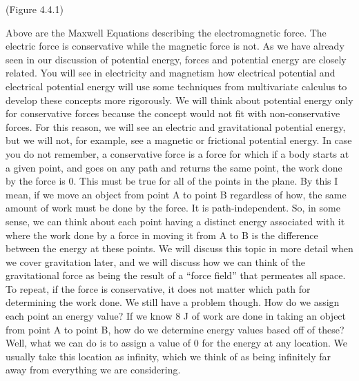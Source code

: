 \begin{center}
(Figure 4.4.1)
\end{center}
Above are the Maxwell Equations describing the electromagnetic force. The electric force is conservative while the magnetic force is not. 
As we have already seen in our discussion of potential energy, forces and potential energy are closely related. You will see in electricity and magnetism how electrical potential and electrical potential energy will use some techniques from multivariate calculus to develop these concepts more rigorously. We will think about potential energy only for conservative forces because the concept would not fit with non-conservative forces. For this reason, we will see an electric and gravitational potential energy, but we will not, for example, see a magnetic or frictional potential energy. In case you do not remember, a conservative force is a force for which if a body starts at a given point, and goes on any path and returns the same point, the work done by the force is 0. This must be true for all of the points in the plane. By this I mean, if we move an object from point A to point B regardless of how, the same amount of work must be done by the force. It is path-independent. So, in some sense, we can think about each point having a distinct energy associated with it where the work done by a force in moving it from A to B is the difference between the energy at these points. We will discuss this topic in more detail when we cover gravitation later, and we will discuss how we can think of the gravitational force as being the result of a “force field” that permeates all space. To repeat, if the force is conservative, it does not matter which path for determining the work done. We still have a problem though. How do we assign each point an energy value? If we know $8$ J of work are done in taking an object from point A to point B, how do we determine energy values based off of these? Well, what we can do is to assign a value of 0 for the energy at any location. We usually take this location as infinity, which we think of as being infinitely far away from everything we are considering.

